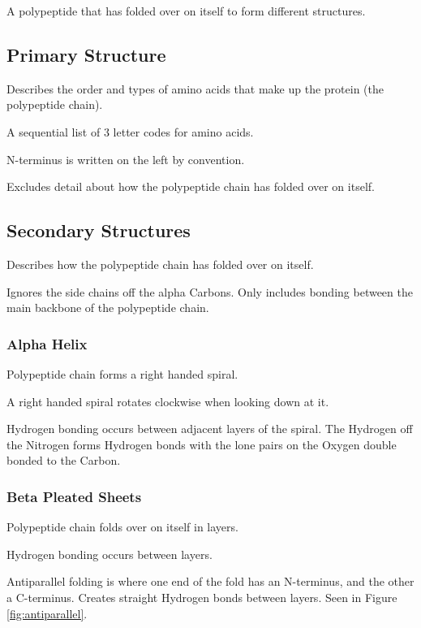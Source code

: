 \documentclass[a4paper,11pt]{article}
\begin{document}
A polypeptide that has folded over on itself to form different structures.


\subsection{Primary Structure}

Describes the order and types of amino acids that make up the protein (the
polypeptide chain).

A sequential list of 3 letter codes for amino acids.

N-terminus is written on the left by convention.

Excludes detail about how the polypeptide chain has folded over on itself.


\subsection{Secondary Structures}

Describes how the polypeptide chain has folded over on itself.

Ignores the side chains off the alpha Carbons. Only includes bonding between
the main backbone of the polypeptide chain.


\subsubsection{Alpha Helix}

Polypeptide chain forms a right handed spiral.

A right handed spiral rotates clockwise when looking down at it.

Hydrogen bonding occurs between adjacent layers of the spiral. The Hydrogen
off the Nitrogen forms Hydrogen bonds with the lone pairs on the Oxygen double
bonded to the Carbon.


\subsubsection{Beta Pleated Sheets}

Polypeptide chain folds over on itself in layers.

Hydrogen bonding occurs between layers.

Antiparallel folding is where one end of the fold has an N-terminus, and the
other a C-terminus. Creates straight Hydrogen bonds between layers. Seen in
Figure \ref{fig:antiparallel}.
\end{document}
